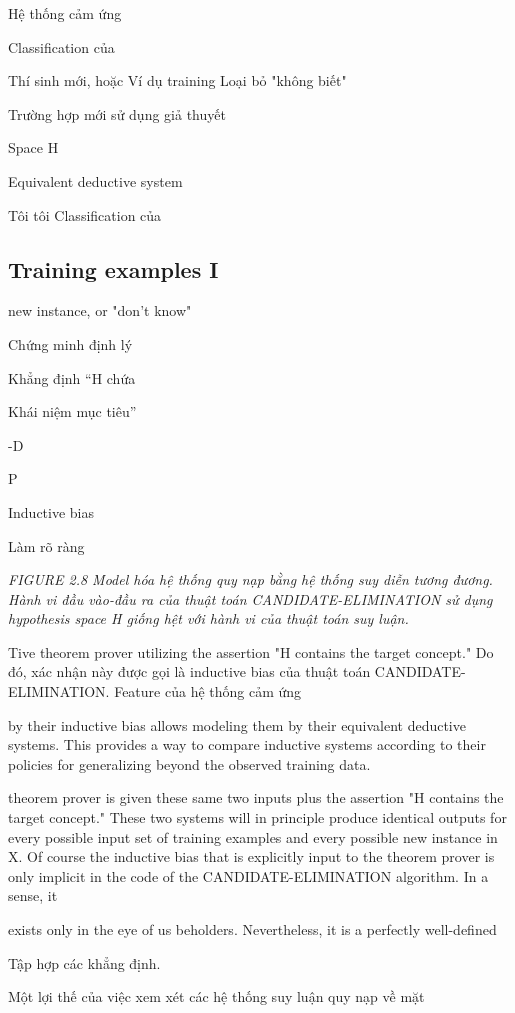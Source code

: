 Hệ thống cảm ứng

Classification của

Thí sinh mới, hoặc Ví dụ training Loại bỏ "không biết"

Trường hợp mới sử dụng giả thuyết

Space H

Equivalent deductive system

Tôi tôi Classification của

\subsection{Training examples I}

new instance, or "don't know"

Chứng minh định lý

Khẳng định “H chứa

Khái niệm mục tiêu”

-D

P

Inductive bias

Làm rõ ràng

\noindent\textit{FIGURE 2.8 Model hóa hệ thống quy nạp bằng hệ thống suy diễn tương đương. Hành vi đầu vào-đầu ra của thuật toán CANDIDATE-ELIMINATION sử dụng hypothesis space H giống hệt với hành vi của thuật toán suy luận.}

Tive theorem prover utilizing the assertion "H contains the target concept." Do đó, xác nhận này được gọi là inductive bias của thuật toán CANDIDATE-ELIMINATION. Feature của hệ thống cảm ứng

by their inductive bias allows modeling them by their equivalent deductive systems. This provides a way to compare inductive systems according to their policies for generalizing beyond the observed training data.

theorem prover is given these same two inputs plus the assertion "H contains the target concept." These two systems will in principle produce identical outputs for every possible input set of training examples and every possible new instance in X. Of course the inductive bias that is explicitly input to the theorem prover is only implicit in the code of the CANDIDATE-ELIMINATION algorithm. In a sense, it

exists only in the eye of us beholders. Nevertheless, it is a perfectly well-defined

Tập hợp các khẳng định.

Một lợi thế của việc xem xét các hệ thống suy luận quy nạp về mặt

